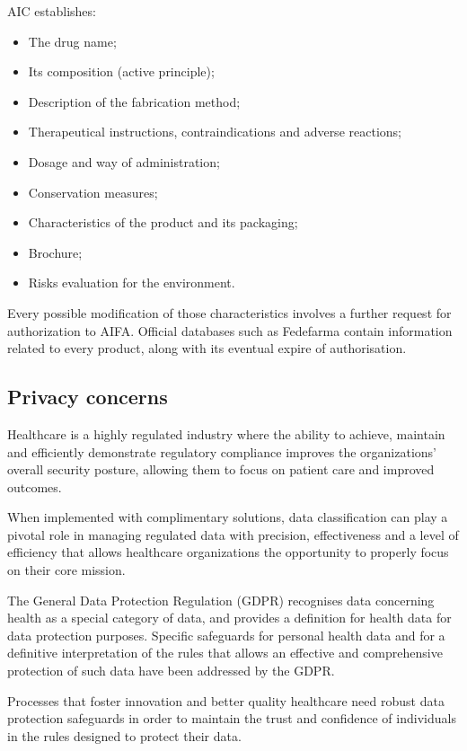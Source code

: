 AIC establishes:
\begin{itemize}
	\item The drug name;
	\item Its composition (active principle);
	\item Description of the fabrication method;
	\item Therapeutical instructions, contraindications and adverse reactions;
	\item Dosage and way of administration;
	 \item Conservation measures;
	 \item Characteristics of the product and its packaging;
	 \item Brochure;
	 \item Risks evaluation for the environment.
\end{itemize}

Every possible modification of those characteristics involves a further request for authorization to AIFA. Official databases such as Fedefarma contain information related to every product, along with its eventual expire of authorisation.

\subsection{Privacy concerns}
Healthcare is a highly regulated industry where the ability to achieve, maintain and efficiently demonstrate regulatory compliance improves the organizations' overall security posture, allowing them to focus on patient care and improved outcomes. 

When implemented with complimentary solutions, data classification can play a pivotal role in managing regulated data with precision, effectiveness and a level of efficiency that allows healthcare organizations the opportunity to properly focus on their core mission\cite{privacy}.

The General Data Protection Regulation (GDPR) recognises data concerning health as a special category of data, and provides a definition for health data for data protection purposes. Specific safeguards for personal health data and for a definitive interpretation of the rules that allows an effective and comprehensive protection of such data have been addressed by the GDPR. 

Processes that foster innovation and better quality healthcare need robust data protection safeguards in order to maintain the trust and confidence of individuals in the rules designed to protect their data\cite{gdpr}.

